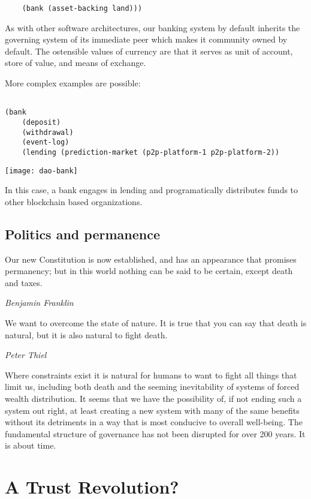 \documentclass{article}
\begin{document}
\begin{description}
\begin{lstlisting}
    (bank (asset-backing land)))
\end{lstlisting}

As with other software architectures, our banking system by default inherits the governing system of its immediate peer which makes it community owned by default.  The ostensible values of currency are that it serves as unit of account, store of value, and means of exchange.

More complex examples are possible:

\begin{lstlisting}

(bank
    (deposit)
    (withdrawal)
    (event-log)
    (lending (prediction-market (p2p-platform-1 p2p-platform-2))
\end{lstlisting}

\texttt{[image: dao-bank]}

In this case, a bank engages in lending and programatically distributes funds to other blockchain based organizations.

\end{description}


\subsection { Politics and permanence }

\epigraph{Our new Constitution is now established, and has an appearance that promises permanency; but in this world nothing can be said to be certain, except death and taxes.}{\textit{Benjamin Franklin}}

\epigraph{We want to overcome the state of nature. It is true that you can say that death is natural, but it is also natural to fight death.
}{\textit{Peter Thiel}}

Where constraints exist it is natural for humans to want to fight all things that limit us, including both death and the seeming inevitability of systems of forced wealth distribution. It seems that we have the possibility of, if not ending such a system out right, at least creating a new system with many of the same benefits without its detriments in a way that is most conducive to overall well-being. The fundamental structure of governance has not been disrupted for over 200 years. It is about time.

\section { A Trust Revolution?}
\end{document}
